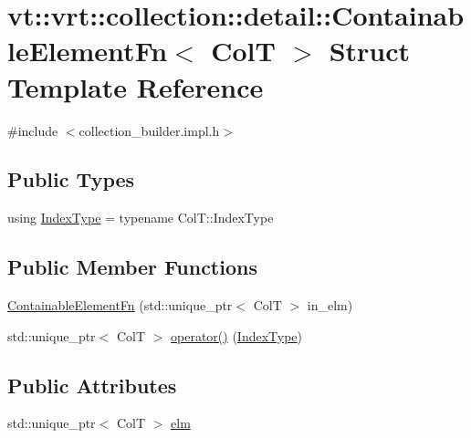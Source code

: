 \hypertarget{structvt_1_1vrt_1_1collection_1_1detail_1_1_containable_element_fn}{}\section{vt\+:\+:vrt\+:\+:collection\+:\+:detail\+:\+:Containable\+Element\+Fn$<$ ColT $>$ Struct Template Reference}
\label{structvt_1_1vrt_1_1collection_1_1detail_1_1_containable_element_fn}


{\ttfamily \#include $<$collection\+\_\+builder.\+impl.\+h$>$}

\subsection*{Public Types}
\begin{DoxyCompactItemize}
\item 
using \hyperlink{structvt_1_1vrt_1_1collection_1_1detail_1_1_containable_element_fn_a8b72c632bf735826e02f41f6d89df5d9}{Index\+Type} = typename Col\+T\+::\+Index\+Type
\end{DoxyCompactItemize}
\subsection*{Public Member Functions}
\begin{DoxyCompactItemize}
\item 
\hyperlink{structvt_1_1vrt_1_1collection_1_1detail_1_1_containable_element_fn_a1a510ac14f89966aef44e5d701eb0957}{Containable\+Element\+Fn} (std\+::unique\+\_\+ptr$<$ ColT $>$ in\+\_\+elm)
\item 
std\+::unique\+\_\+ptr$<$ ColT $>$ \hyperlink{structvt_1_1vrt_1_1collection_1_1detail_1_1_containable_element_fn_aba8062d316a87a8e199455e589eac499}{operator()} (\hyperlink{structvt_1_1vrt_1_1collection_1_1detail_1_1_containable_element_fn_a8b72c632bf735826e02f41f6d89df5d9}{Index\+Type})
\end{DoxyCompactItemize}
\subsection*{Public Attributes}
\begin{DoxyCompactItemize}
\item 
std\+::unique\+\_\+ptr$<$ ColT $>$ \hyperlink{structvt_1_1vrt_1_1collection_1_1detail_1_1_containable_element_fn_a7db28b6272022df76cf9eb5dd8a20048}{elm}
\end{DoxyCompactItemize}


